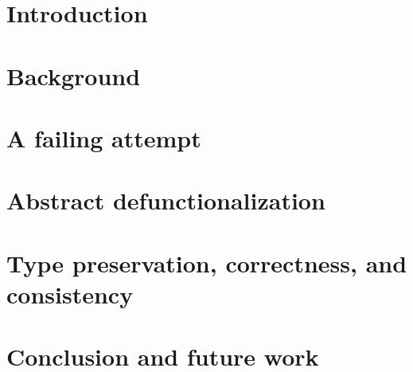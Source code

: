 \documentclass[a4paper,12pt]{report}
\theoremstyle{definition}
\begin{document}
\pagestyle{empty}
\singlespacing

% 
% 
\onehalfspacing





\setcounter{page}{0}
\pagestyle{plain}
\tableofcontents
\listoffigures

\onehalfspacing


\chapter{Introduction}
\setcounter{page}{1} 


\setcounter{chapter}{1}
\chapter{Background}


\setcounter{chapter}{2}
\chapter{A failing attempt}


\setcounter{chapter}{3}
\chapter{Abstract defunctionalization}


\setcounter{chapter}{4}
\chapter{Type preservation, correctness, and consistency}


\setcounter{chapter}{5}
\chapter{Conclusion and future work}



\singlespacing
{}
 
 
\end{document}
